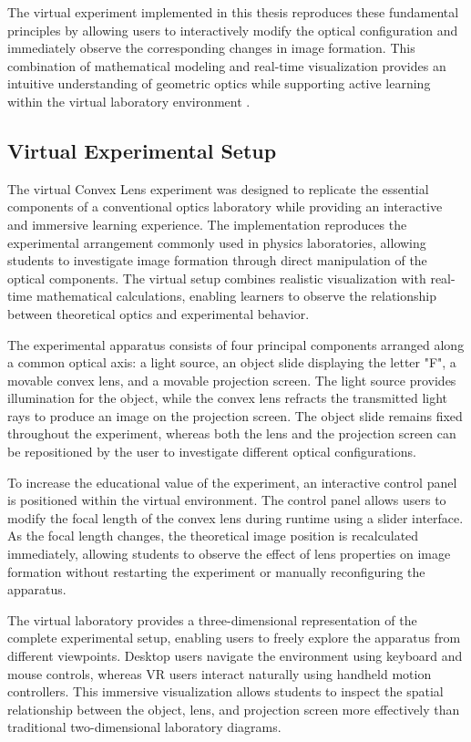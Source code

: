 The virtual experiment implemented in this thesis reproduces these fundamental principles by allowing users to interactively modify the optical configuration and immediately observe the corresponding changes in image formation. This combination of mathematical modeling and real-time visualization provides an intuitive understanding of geometric optics while supporting active learning within the virtual laboratory environment \cite{hecht2017optics}.

\subsection{Virtual Experimental Setup}

The virtual Convex Lens experiment was designed to replicate the essential components of a conventional optics laboratory while providing an interactive and immersive learning experience. The implementation reproduces the experimental arrangement commonly used in physics laboratories, allowing students to investigate image formation through direct manipulation of the optical components. The virtual setup combines realistic visualization with real-time mathematical calculations, enabling learners to observe the relationship between theoretical optics and experimental behavior.

The experimental apparatus consists of four principal components arranged along a common optical axis: a light source, an object slide displaying the letter "F", a movable convex lens, and a movable projection screen. The light source provides illumination for the object, while the convex lens refracts the transmitted light rays to produce an image on the projection screen. The object slide remains fixed throughout the experiment, whereas both the lens and the projection screen can be repositioned by the user to investigate different optical configurations.

To increase the educational value of the experiment, an interactive control panel is positioned within the virtual environment. The control panel allows users to modify the focal length of the convex lens during runtime using a slider interface. As the focal length changes, the theoretical image position is recalculated immediately, allowing students to observe the effect of lens properties on image formation without restarting the experiment or manually reconfiguring the apparatus.

The virtual laboratory provides a three-dimensional representation of the complete experimental setup, enabling users to freely explore the apparatus from different viewpoints. Desktop users navigate the environment using keyboard and mouse controls, whereas VR users interact naturally using handheld motion controllers. This immersive visualization allows students to inspect the spatial relationship between the object, lens, and projection screen more effectively than traditional two-dimensional laboratory diagrams.

